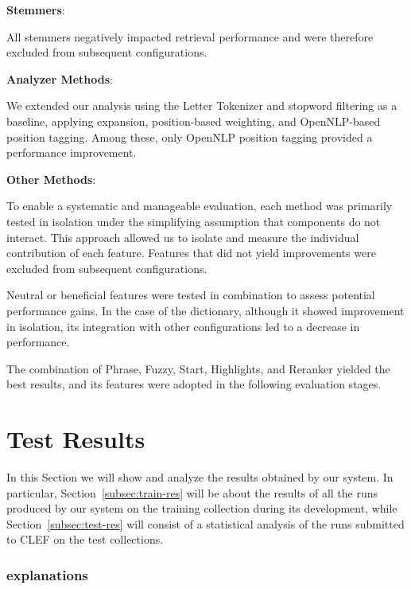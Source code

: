 \vspace{1\baselineskip}
\textbf{Stemmers}:

All stemmers negatively impacted retrieval performance and were therefore excluded from subsequent configurations.

\vspace{1\baselineskip}
\textbf{Analyzer Methods}:

We extended our analysis using the Letter Tokenizer and stopword filtering as a baseline, applying expansion, position-based weighting, and OpenNLP-based position tagging. Among these, only OpenNLP position tagging provided a performance improvement.

\vspace{1\baselineskip}
\textbf{Other Methods}:

To enable a systematic and manageable evaluation, each method was primarily tested in isolation under the simplifying assumption that components do not interact. This approach allowed us to isolate and measure the individual contribution of each feature. Features that did not yield improvements were excluded from subsequent configurations.

Neutral or beneficial features were tested in combination to assess potential performance gains. In the case of the dictionary, although it showed improvement in isolation, its integration with other configurations led to a decrease in performance.

The combination of Phrase, Fuzzy, Start, Highlights, and Reranker yielded the best results, and its features were adopted in the following evaluation stages.


\section{Test Results}
\label{sec:testresults}

In this Section we will show and analyze the results obtained by our system.
In particular, Section~\ref{subsec:train-res} will be about the results of all the runs produced by our system on the training collection during its development, while Section~\ref{subsec:test-res} will consist of a statistical analysis of the runs submitted to \ac{CLEF} on the test collections.

\subsubsection{explanations }
\label{subsubsec:heldout-res}


